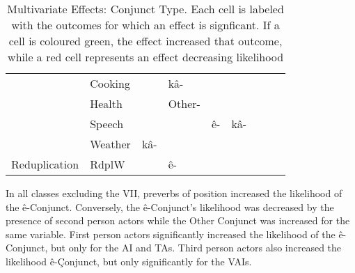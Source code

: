 \begin{table}[h!]
\begin{tabular}{@{}llllllllllll@{}}
               & Cooking             &                                & \multicolumn{3}{l}{\cellcolor[HTML]{EA9999}kâ-}                                            &                               &                                &                                   &                                    &               &                                           \\
               & Health              &                                & \multicolumn{3}{l}{\cellcolor[HTML]{B6D7A8}Other-}                                         &                               &                                &                                   &                                    &               &                                           \\
               & Speech              &                                &                                     &              &                                          & \cellcolor[HTML]{EA9999}ê- & \multicolumn{2}{l}{\cellcolor[HTML]{EA9999}kâ-}                 &                                    &               &                                           \\
               & Weather             & \cellcolor[HTML]{B6D7A8}kâ- &                                     &              &                                          &                               &                                &                                   &                                    &               &                                           \\
Reduplication  & RdplW               &                                & \multicolumn{3}{l}{\cellcolor[HTML]{B6D7A8}ê-}                                             &                               &                                &                                   &                                    &               &                                           \\ \bottomrule
\end{tabular}
            \caption{
                   Multivariate Effects: Conjunct Type. Each cell is labeled with the outcomes for which an effect is signficant. If a cell is coloured green, the effect increased that outcome, while a red cell represents an effect decreasing likelihood  \\ \label{tab:cnjtypedisc}
              }
\end{table}


In all classes excluding the VII, preverbs of position increased the likelihood of the ê-Conjunct. Conversely, the ê-Conjunct's likelihood was decreased by the presence of second person actors while the Other Conjunct was increased for the same variable. First person actors significantly increased the likelihood of the ê-Conjunct, but only for the AI and TAs. Third person actors also increased the likelihood ê-Çonjunct, but only significantly for the VAIs.

